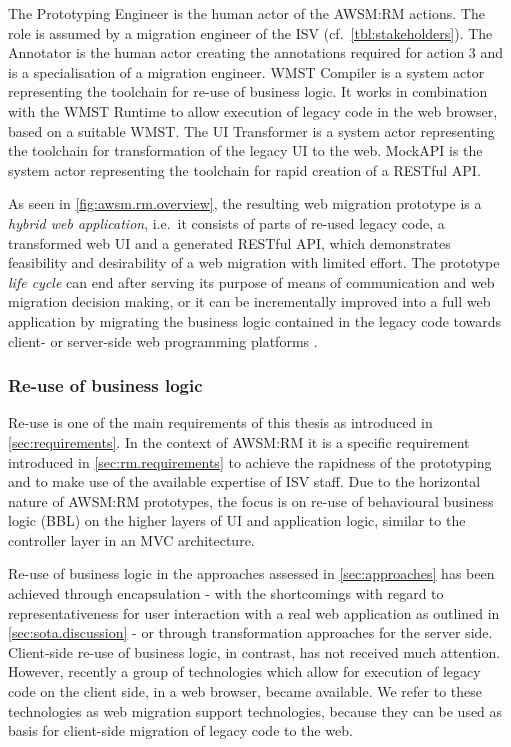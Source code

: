 The Prototyping Engineer is the human actor of the AWSM:RM actions.
The role is assumed by a migration engineer of the ISV (cf.~\cref{tbl:stakeholders}).
The Annotator is the human actor creating the annotations required for action 3 and is a specialisation of a migration engineer.
WMST Compiler is a system actor representing the toolchain for re-use of business logic.
It works in combination with the WMST Runtime to allow execution of legacy code in the web browser, based on a suitable WMST.
The UI Transformer is a system actor representing the toolchain for transformation of the legacy UI to the web.
MockAPI is the system actor representing the toolchain for rapid creation of a RESTful API.

As seen in \cref{fig:awsm.rm.overview}, the resulting web migration prototype is a \emph{hybrid web application}, i.e.~it consists of parts of re-used legacy code, a transformed web UI and a generated RESTful API, which demonstrates feasibility and desirability of a web migration with limited effort.
The prototype \emph{life cycle} \autocite{SWEBOK2014} can end after serving its purpose of means of communication and web migration decision making, or it can be incrementally improved into a full web application by migrating the business logic contained in the legacy code towards client- or server-side web programming platforms \autocites[cf.~evolutionary prototyping][]{SWEBOK2014}{Wallmueller2001SoftwareQuality}.

\hypertarget{sec:rewamp}{%
\subsubsection{Re-use of business logic}\label{sec:rewamp}}

Re-use is one of the main requirements of this thesis as introduced in \cref{sec:requirements}.
In the context of AWSM:RM it is a specific requirement introduced in \cref{sec:rm.requirements} to achieve the rapidness of the prototyping and to make use of the available expertise of ISV staff.
Due to the horizontal nature \autocite{Wallmueller2001SoftwareQuality} of AWSM:RM prototypes, the focus is on re-use of behavioural business logic (BBL) on the higher layers of UI and application logic, similar to the controller layer in an MVC architecture.

Re-use of business logic in the approaches assessed in \cref{sec:approaches} has been achieved through encapsulation - with the shortcomings with regard to representativeness for user interaction with a real web application as outlined in \cref{sec:sota.discussion} - or through transformation approaches for the server side.
Client-side re-use of business logic, in contrast, has not received much attention.
However, recently a group of technologies which allow for execution of legacy code on the client side, in a web browser, became available.
We refer to these technologies as web migration support technologies, because they can be used as basis for client-side migration of legacy code to the web.

